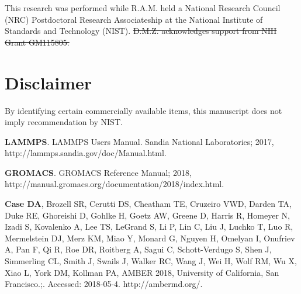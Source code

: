 \documentclass[9pt,bestpractices]{livecoms}
\providecommand{\DIFdel}[1]{{\protect\color{red}\sout{#1}}}                      %
\providecommand{\DIFaddbegin}{} %
\providecommand{\DIFaddend}{} %
\providecommand{\DIFdelbegin}{} %
\providecommand{\DIFdelend}{} %
\begin{document}
This research was performed while R.A.M. held a National Research Council (NRC) Postdoctoral Research Associateship at the National Institute of Standards and Technology (NIST).
\DIFdelbegin \DIFdel{D.M.Z. acknowledges support from NIH Grant GM115805.
}\DIFdelend 

\section*{Disclaimer}

By identifying certain commercially available items, this manuscript does not imply recommendation by NIST.

\DIFdelbegin %
\DIFdelend \DIFaddbegin \begin{thebibliography}{59}
\DIFaddend \providecommand{\natexlab}[1]{#1}
\providecommand{\urlprefix}{}
\providecommand{\doiprefix}{doi: }

\textbf{\color{LiveCoMSMediumGrey} LAMMPS}.
\newblock LAMMPS Users Manual.
\newblock Sandia National Laboratories; 2017,
  http://lammps.sandia.gov/doc/Manual.html.

\textbf{\color{LiveCoMSMediumGrey} GROMACS}.
\newblock GROMACS Reference Manual; 2018,
  http://manual.gromacs.org/documentation/2018/index.html.

\textbf{\color{LiveCoMSMediumGrey} Case DA}, Brozell SR, Cerutti DS, Cheatham
  TE, Cruzeiro VWD, Darden TA, Duke RE, Ghoreishi D, Gohlke H, Goetz AW, Greene
  D, Harris R, Homeyer N, Izadi S, Kovalenko A, Lee TS, LeGrand S, Li P, Lin C,
  Liu J, Luchko T, Luo R, Mermelstein DJ, Merz KM, Miao Y, Monard G, Nguyen H,
  Omelyan I, Onufriev A, Pan F, Qi R, Roe DR, Roitberg A, Sagui C,
  Schott-Verdugo S, Shen J, Simmerling CL, Smith J, Swails J, Walker RC, Wang
  J, Wei H, Wolf RM, Wu X, Xiao L, York DM, Kollman PA, {AMBER 2018, University
  of California, San Francisco.};.
\newblock Accessed: 2018-05-4.
\newblock http://ambermd.org/.


\end{thebibliography}
\end{document}
